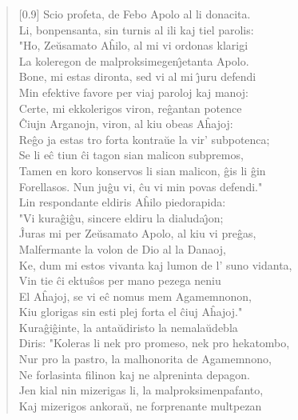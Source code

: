 \begin{verse}[0.9\textwidth]
          Scio profeta, de Febo Apolo al li donacita.\\
          Li, bonpensanta, sin turnis al ili kaj tiel parolis:\\
           \vin  "Ho, Ze\u usamato A\^hilo, al mi vi ordonas klarigi\\
          La koleregon de malproksimegen\^{\j}etanta Apolo.\\
          Bone, mi estas dironta, sed vi al mi \^{\j}uru defendi\\
          Min efektive favore per viaj paroloj kaj manoj:\\
          Certe, mi ekkolerigos viron, re\^gantan potence\\
          \^Ciujn Arganojn, viron, al kiu obeas A\^hajoj:\\
          Re\^go ja estas tro forta kontra\u ue la vir' subpotenca;\\
          Se li e\^c tiun \^ci tagon sian malicon subpremos,\\
          Tamen en koro konservos li sian malicon, \^gis li \^gin\\
          Forellasos. Nun ju\^gu vi, \^cu vi min povas defendi."\\
          \vin   Lin respondante eldiris A\^hilo piedorapida:\\
          "Vi kura\^gi\^gu, sincere eldiru la dialuda\^{\j}on;\\
          \^Juras mi per Ze\u usamato Apolo, al kiu vi pre\^gas,\\
          Malfermante la volon de Dio al la Danaoj,\\
          Ke, dum mi estos vivanta kaj lumon de l' suno vidanta,\\
          Vin tie \^ci ektu\^sos per mano pezega neniu\\
          El A\^hajoj, se vi e\^c nomus mem Agamemnonon,\\
          Kiu glorigas sin esti plej forta el \^ciuj A\^hajoj."\\
          \vin   Kura\^gi\^ginte, la anta\u udiristo la nemala\u udebla\\
          Diris: "Koleras li nek pro promeso, nek pro hekatombo,\\
          Nur pro la pastro, la malhonorita de Agamemnono,\\
          Ne forlasinta filinon kaj ne alpreninta depagon.\\
          Jen kial nin mizerigas li, la malproksimenpafanto,\\
          Kaj mizerigos ankora\u u, ne forprenante multpezan\\

\end{verse}
